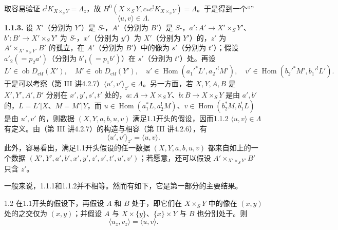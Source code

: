 取容易验证 $c^!K_{X\times_S Y}=\Lambda_z$，故 $H^0(X\times_S Y,c_*c^!K_{X\times_S Y})=\Lambda$。于是得到一个“”
\[
 \langle u,v\rangle\in\Lambda.\tag{1.1.2}
\]
\textbf{1.1.3.} 设 $X'$（分别为 $Y'$）是 $S$-，$A'$（分别为 $B'$）是 $S$-，$a':A'\to X'\times_S Y'$、$b':B'\to X'\times_S Y'$ 为 $S$-，$x'$（分别为 $y'$）为 $X'$（分别为 $Y'$）的，$z'$ 为 $A'\times_{X'\times_S Y'}B'$ 的孤立，在 $A'$（分别为 $B'$）中的像为 $s'$（分别为 $t'$）；假设 $a'_2(=p_2a')$（分别为 $b'_1(=p_1b')$）在 $s'$（分别为 $t'$）处。再设
\[
 L'\in\operatorname{ob}D_{\mathrm{ctf}}(X'),\quad M'\in\operatorname{ob}D_{\mathrm{ctf}}(Y'),\quad
 u'\in\operatorname{Hom}(a_1'^*L',a_2'^!M'),\quad
 v'\in\operatorname{Hom}(b_2'^*M',b_1'^!L').
\]
于是可以考察（第 III 讲4.2.7）$\langle u',v'\rangle_{z'}\in\Lambda$。另一方面，若 $X,Y,A,B$ 是 $X',Y',A',B'$ 分别在 $x',y',s',t'$ 处的，$a:A\to X\times_S Y$、$b:B\to X\times_S Y$ 是由 $a',b'$ 的，$L=L'|X$、$M=M'|Y$，而 $u\in\operatorname{Hom}(a_1^*L,a_2^!M)$、$v\in\operatorname{Hom}(b_2^*M,b_1^!L)$ 是由 $u',v'$ 的，则数据 $(X,Y,a,b,u,v)$ 满足1.1开头的假设，因而1.1.2 $\langle u,v\rangle\in\Lambda$ 有定义。由（第 III 讲4.2.7）的构造与相容（第 III 讲4.2.6），有
\[
 \langle u',v'\rangle_{z'}=\langle u,v\rangle.
\]
此外，容易看出，满足1.1开头假设的任一数据 $(X,Y,a,b,u,v)$ 都来自如上的一个数据 $(X',Y',a',b',x',y',z',s',t',u',v')$；若愿意，还可以假设 $A'\times_{X'\times_S Y'}B'$ 只含 $z'$。

一般来说，1.1.1和1.1.2并不相等。然而有如下，它是第一部分的主要结果。
\begin{SGAresult}{}{1.2}
在1.1开头的假设下，再假设 $A$ 和 $B$ 处于，即它们在 $X\times_S Y$ 中的像在 $(x,y)$ 处的之交仅为 $(x,y)$；并假设 $A$ 与 $X\times\{y\}$、$\{x\}\times Y$ 与 $B$ 也分别处于。则
\[
 \langle u_z,v_z\rangle=\langle u,v\rangle.\tag{1.2.1}
\]
\end{SGAresult}


